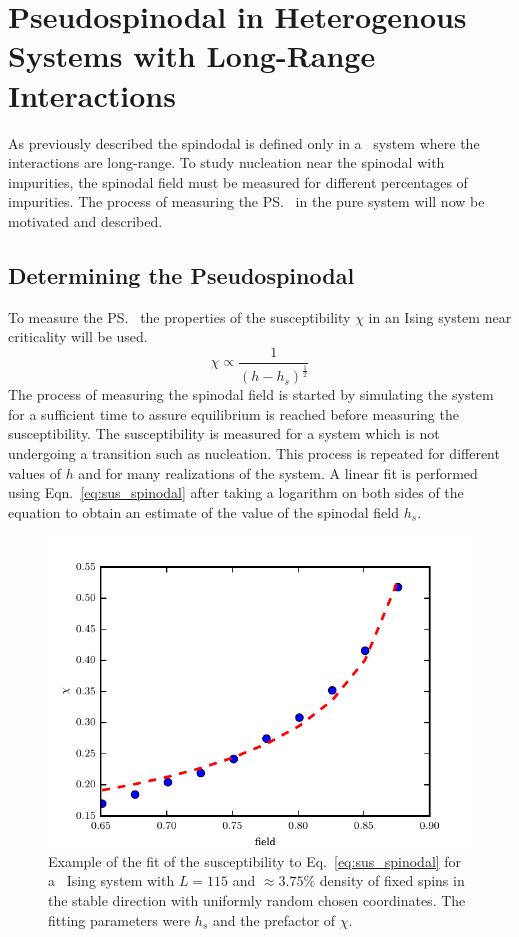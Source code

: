 
\chapter{\label{chp:pseudo}Pseudospinodal in Heterogenous Systems with Long-Range Interactions}

As previously described the spindodal is defined only in a \mf\ system where the   interactions are long-range. To study nucleation near the spinodal with impurities, the spinodal field must be measured for different percentages of impurities. The process of measuring the \ps\ in the pure system will now be motivated and described. 

\section{Determining the Pseudospinodal}
To measure the \ps\ the properties of the susceptibility $\chi$ in an Ising system near criticality will be used.   %
\begin{equation}
\label{eq:sus_spinodal}
\chi \propto \frac{1}{(h-h_s)^\frac{1}{2}}
\end{equation}%
The process of measuring the spinodal field is started by simulating the system for a sufficient time to assure equilibrium is reached before measuring the susceptibility. The susceptibility is measured for a system which is not undergoing a transition such as nucleation. This process is repeated for different values of $h$ and for many realizations of the system. A linear fit is performed using Eqn.~\eqref{eq:sus_spinodal} after taking a logarithm on both sides of the equation to obtain an estimate of the value of the spinodal field $h_s$.      %

\begin{figure}[!h]
    \centering
      \includegraphics[scale=0.975]{Figures/spinodal/exampleSusFit1n.pdf}
    \caption{Example of the fit of the susceptibility to Eq.~\eqref{eq:sus_spinodal}  for a \het\ Ising system with $L=115$ and $\approx 3.75\%$ density of fixed spins in the stable direction with uniformly random chosen coordinates. The fitting parameters were $h_s$ and the prefactor of $\chi$. }
  \label{fig:ps_fit}
\end{figure}%

